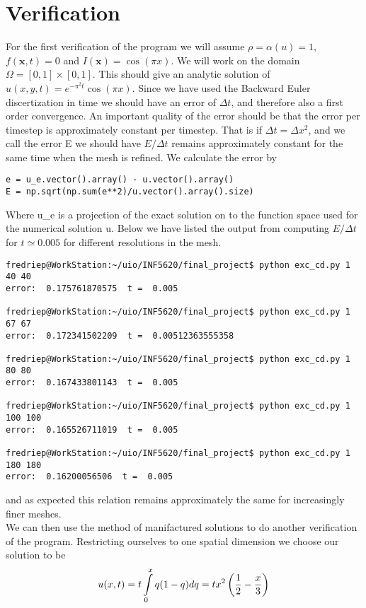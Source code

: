 \documentclass[a4paper,english, 10pt, twoside]{article}
\begin{document}
\section{Verification}
For the first verification of the program we will assume $\rho = \alpha(u) = 1$, $f(\mathbf{x},t) = 0$ and $I(\mathbf{x}) = \cos(\pi x)$. We 
will work on the domain $\Omega = [0,1]\times[0,1]$. This should give an analytic solution of $u(x,y,t) = e^{-\pi^2t}\cos(\pi x)$. Since we have used 
the Backward Euler discertization in time we should have an error of $\Delta t$, and therefore also a first order convergence. An important 
quality of the error should be that the error per timestep is approximately constant per timestep. That is if $\Delta t = \Delta x^2$, and 
we call the error E we should have $E/\Delta t$ remains approximately constant for the same time when the mesh is refined. We calculate the 
error by
\begin{lstlisting}
e = u_e.vector().array() - u.vector().array()
E = np.sqrt(np.sum(e**2)/u.vector().array().size)
\end{lstlisting}
Where u\_e is a projection of the exact solution on to the function space used for the numerical solution u. Below we have listed the output 
from computing $E/\Delta t$ for $t\simeq0.005$ for different resolutions in the mesh.
\begin{lstlisting}
fredriep@WorkStation:~/uio/INF5620/final_project$ python exc_cd.py 1 40 40
error:  0.175761870575  t =  0.005

fredriep@WorkStation:~/uio/INF5620/final_project$ python exc_cd.py 1 67 67
error:  0.172341502209  t =  0.00512363555358

fredriep@WorkStation:~/uio/INF5620/final_project$ python exc_cd.py 1 80 80
error:  0.167433801143  t =  0.005

fredriep@WorkStation:~/uio/INF5620/final_project$ python exc_cd.py 1 100 100
error:  0.165526711019  t =  0.005

fredriep@WorkStation:~/uio/INF5620/final_project$ python exc_cd.py 1 180 180
error:  0.16200056506  t =  0.005
\end{lstlisting}
and as expected this relation remains approximately the same for increasingly finer meshes.\\
We can then use the method of manifactured solutions to do another verification of the program. Restricting ourselves to one spatial dimension we 
choose our solution to be 
\begin{equation}
 u(x,t) = t\int\limits_0^xq(1-q)dq = tx^2\left({1\over2}-{x\over3}\right)
\end{equation}
\end{document}
